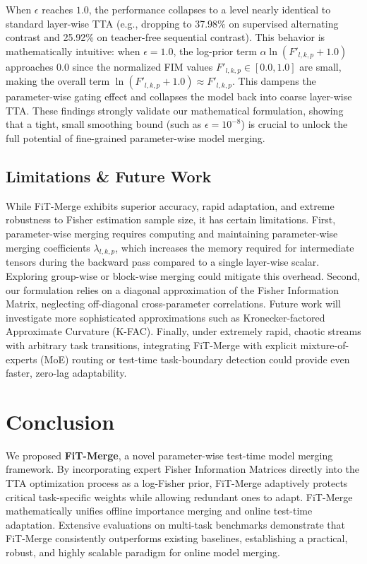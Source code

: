 \documentclass{article}
\theoremstyle{plain}
\theoremstyle{definition}
\theoremstyle{remark}
\begin{document}
When $\epsilon$ reaches $1.0$, the performance collapses to a level nearly identical to standard layer-wise TTA (e.g., dropping to 37.98\% on supervised alternating contrast and 25.92\% on teacher-free sequential contrast). This behavior is mathematically intuitive: when $\epsilon = 1.0$, the log-prior term $\alpha \ln(F'_{l,k,p} + 1.0)$ approaches $0.0$ since the normalized FIM values $F'_{l,k,p} \in [0.0, 1.0]$ are small, making the overall term $\ln(F'_{l,k,p} + 1.0) \approx F'_{l,k,p}$. This dampens the parameter-wise gating effect and collapses the model back into coarse layer-wise TTA. These findings strongly validate our mathematical formulation, showing that a tight, small smoothing bound (such as $\epsilon = 10^{-8}$) is crucial to unlock the full potential of fine-grained parameter-wise model merging.

\subsection{Limitations \& Future Work}
While FiT-Merge exhibits superior accuracy, rapid adaptation, and extreme robustness to Fisher estimation sample size, it has certain limitations. First, parameter-wise merging requires computing and maintaining parameter-wise merging coefficients $\lambda_{l,k,p}$, which increases the memory required for intermediate tensors during the backward pass compared to a single layer-wise scalar. Exploring group-wise or block-wise merging could mitigate this overhead. Second, our formulation relies on a diagonal approximation of the Fisher Information Matrix, neglecting off-diagonal cross-parameter correlations. Future work will investigate more sophisticated approximations such as Kronecker-factored Approximate Curvature (K-FAC). Finally, under extremely rapid, chaotic streams with arbitrary task transitions, integrating FiT-Merge with explicit mixture-of-experts (MoE) routing or test-time task-boundary detection could provide even faster, zero-lag adaptability.

\section{Conclusion}
\label{sec:conclusion}
We proposed \textbf{FiT-Merge}, a novel parameter-wise test-time model merging framework. By incorporating expert Fisher Information Matrices directly into the TTA optimization process as a log-Fisher prior, FiT-Merge adaptively protects critical task-specific weights while allowing redundant ones to adapt. FiT-Merge mathematically unifies offline importance merging and online test-time adaptation. Extensive evaluations on multi-task benchmarks demonstrate that FiT-Merge consistently outperforms existing baselines, establishing a practical, robust, and highly scalable paradigm for online model merging.



\end{document}
